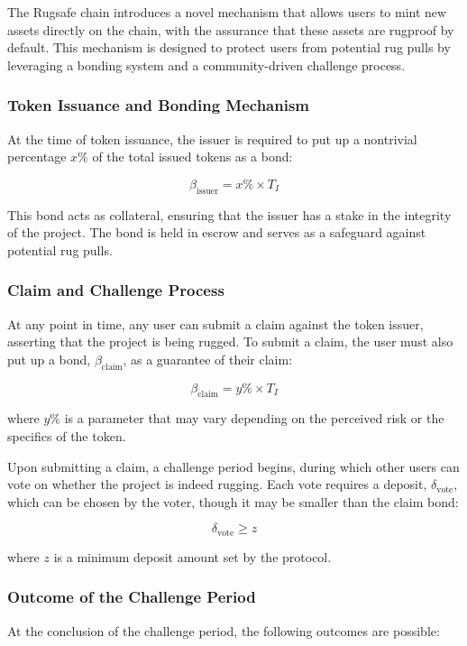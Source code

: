 \documentclass{article}
\begin{document}
The Rugsafe chain introduces a novel mechanism that allows users to mint new assets directly on the chain, with the assurance that these assets are rugproof by default. This mechanism is designed to protect users from potential rug pulls by leveraging a bonding system and a community-driven challenge process.

\subsubsection{Token Issuance and Bonding Mechanism}

At the time of token issuance, the issuer is required to put up a nontrivial percentage \(x\%\) of the total issued tokens as a bond:

\[
\beta_{\text{issuer}} = x\% \times T_I
\]

This bond acts as collateral, ensuring that the issuer has a stake in the integrity of the project. The bond is held in escrow and serves as a safeguard against potential rug pulls.

\subsubsection{Claim and Challenge Process}

At any point in time, any user can submit a claim against the token issuer, asserting that the project is being rugged. To submit a claim, the user must also put up a bond, \(\beta_{\text{claim}}\), as a guarantee of their claim:

\[
\beta_{\text{claim}} = y\% \times T_I
\]

where \(y\%\) is a parameter that may vary depending on the perceived risk or the specifics of the token.

Upon submitting a claim, a challenge period begins, during which other users can vote on whether the project is indeed rugging. Each vote requires a deposit, \(\delta_{\text{vote}}\), which can be chosen by the voter, though it may be smaller than the claim bond:

\[
\delta_{\text{vote}} \geq z
\]

where \(z\) is a minimum deposit amount set by the protocol.

\subsubsection{Outcome of the Challenge Period}

At the conclusion of the challenge period, the following outcomes are possible:
\end{document}
